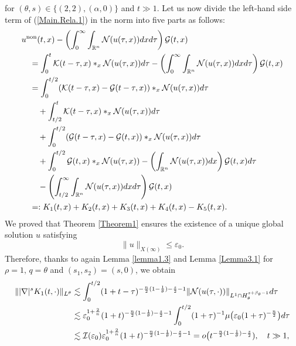 \documentclass[11pt,reqno]{amsart}
\begin{document}
for $(\theta, s) \in \{(2,2), (\alpha, 0)\}$ and $ t \gg 1$.  Let us now divide the left-hand side term of (\ref{Main.Rela.1}) in the norm into five parts as follows:
\begin{align}
    &u^{\rm non}(t,x)- \left(\int_0^{\infty} \int_{\mathbb{R}^n} \mathcal{N}(u(\tau, x))dxd\tau\right) \mathcal{G}(t,x) \notag\\
    &\quad= \int_0^t \mathcal{K}(t-\tau, x) \ast_x \mathcal{N}(u(\tau,x)) d\tau - \left(\int_0^{\infty} \int_{\mathbb{R}^n} \mathcal{N}(u(\tau, x))dxd\tau\right) \mathcal{G}(t,x) \notag\\
    &\quad= \int_0^{t/2} (\mathcal{K}(t-\tau, x)-\mathcal{G}(t-\tau,x)) \ast_x \mathcal{N}(u(\tau,x)) d\tau \notag\\
    &\quad\quad+ \int_{t/2}^t \mathcal{K}(t-\tau, x) \ast_x \mathcal{N}(u(\tau,x)) d\tau \notag\\
    &\quad\quad+ \int_0^{t/2} (\mathcal{G}(t-\tau,x) - \mathcal{G}(t,x)) \ast_x \mathcal{N}(u(\tau,x)) d\tau\notag\\
    &\quad\quad + \int_0^{t/2} \mathcal{G}(t,x) \ast_x \mathcal{N}(u(\tau,x)) - \left(\int_{\mathbb{R}^n} \mathcal{N}(u(\tau, x))dx\right) \mathcal{G}(t,x) d\tau\notag\\
    &\quad\quad - \left(\int_{t/2}^\infty \int_{\mathbb{R}^n} \mathcal{N}(u(\tau, x))dxd\tau\right) \mathcal{G}(t,x)\notag\\
    &\quad =: K_1(t,x)+ K_2(t,x) + K_3(t,x) + K_4(t,x) - K_5(t,x). \label{Relation0}
\end{align}
We proved that Theorem \ref{Theorem1} ensures the existence of a unique global solution $u$ satisfying $$\|u\|_{X(\infty)} \leq \varepsilon_0.$$ 
Therefore, thanks to again Lemma \ref{lemma1.3} and Lemma \ref{Lemma3.1} for $\rho = 1, \, q = \theta$ and $(s_1, s_2) = (s,0)$, we obtain
\begin{align}
    \||\nabla|^s K_1(t,\cdot)\|_{L^\theta} &\lesssim \int_0^{t/2} (1+t-\tau)^{-\frac{n}{2}(1-\frac{1}{\theta})-\frac{s}{2}-1} \|\mathcal{N}(u(\tau,\cdot))\|_{L^1 \cap H^{s+\beta_\theta-1}_{\theta}} d\tau \notag\\
    & \lesssim \varepsilon_0^{1+\frac{2}{n}} (1+t)^{-\frac{n}{2}(1-\frac{1}{\theta})-\frac{s}{2}-1} \int_0^{t/2} (1+\tau)^{-1} \mu\big(\varepsilon_0 (1+\tau)^{-\frac{n}{2}}\big) d\tau\notag\\
    &\lesssim \mathcal{I}(\varepsilon_0) \varepsilon_0^{1+\frac{2}{n}} (1+t)^{-\frac{n}{2}(1-\frac{1}{\theta})-\frac{s}{2}-1} = o\big(t^{-\frac{n}{2}(1-\frac{1}{\theta})-\frac{s}{2}}),  \quad t \gg 1, \label{Relation1}
\end{align}
\end{document}
